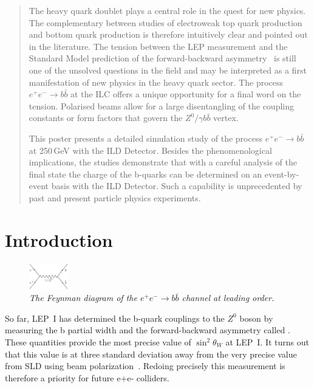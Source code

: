 
\color{Navy} %

\begin{abstract}
The heavy quark doublet plays a central role in the quest for new physics. The complementary between studies of electroweak top quark production and bottom quark production is therefore intuitively clear and pointed out in the literature.
The tension between the LEP measurement and the Standard Model prediction of the forward-backward asymmetry \afb\ is still one of the unsolved questions in the field and may be interpreted as a first manifestation of new physics in the heavy quark sector. The process $e^+e^-\to b\bar{b}$ at the ILC offers a unique opportunity for a final word on the tension. Polarised beams allow for a large disentangling of the coupling constants or form factors that govern the $Z^0/\gamma b \bar{b}$ vertex.

This poster presents a detailed simulation study of the process $e^+e^-\to b\bar{b}$ at 250\,GeV with the ILD Detector. Besides the phenomenological implications, the studies demonstrate that with a careful analysis of the final state the charge of the b-quarks can be determined on an event-by-event basis with the ILD Detector. Such a capability is unprecedented by past and present particle physics experiments.
\end{abstract}


\color{SaddleBrown} %

\section*{Introduction}
\setlength{\columnsep}{20pt}%
\begin{figure}
	
	\includegraphics[width=0.15\textwidth]{figures/bbbar.eps}
	\caption{\sl The Feynman diagram of the $e^+ e^-\to b\bar{b}$ channel at leading order.}
	\label{fig:bbbar}
\end{figure}

So far, LEP~I has determined the b-quark couplings to the $Z^0$ boson by measuring the b partial width 
and the forward-backward asymmetry called \afb. 
These quantities provide the most precise value of $\sin^2\theta_W$ at LEP~I. It turns out that this value is at three standard deviation away from the very precise value from SLD using beam polarization~\cite{bib:AfbSMFit}. 
Redoing precisely this measurement is therefore a priority for future e+e‐ colliders. 




